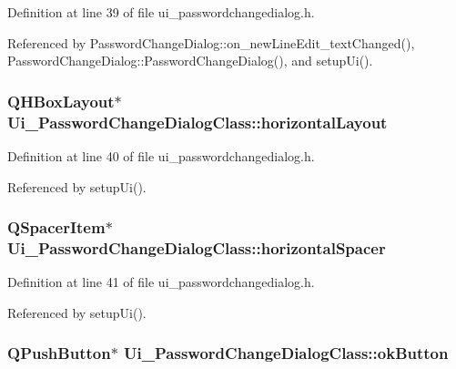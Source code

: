 Definition at line 39 of file ui\_\-passwordchangedialog.h.

Referenced by PasswordChangeDialog::on\_\-newLineEdit\_\-textChanged(), PasswordChangeDialog::PasswordChangeDialog(), and setupUi().\hypertarget{class_ui___password_change_dialog_class_3b41b6252f3602ab1cb67f958ed87c5e}{
\subsubsection[horizontalLayout]{\setlength{\rightskip}{0pt plus 5cm}QHBoxLayout$\ast$ {\bf Ui\_\-PasswordChangeDialogClass::horizontalLayout}}}
\label{class_ui___password_change_dialog_class_3b41b6252f3602ab1cb67f958ed87c5e}




Definition at line 40 of file ui\_\-passwordchangedialog.h.

Referenced by setupUi().\hypertarget{class_ui___password_change_dialog_class_c0836409454080446b32ea2f1e7375f3}{
\subsubsection[horizontalSpacer]{\setlength{\rightskip}{0pt plus 5cm}QSpacerItem$\ast$ {\bf Ui\_\-PasswordChangeDialogClass::horizontalSpacer}}}
\label{class_ui___password_change_dialog_class_c0836409454080446b32ea2f1e7375f3}




Definition at line 41 of file ui\_\-passwordchangedialog.h.

Referenced by setupUi().\hypertarget{class_ui___password_change_dialog_class_2452c6e8211eb599dc99f288d1bcde72}{
\subsubsection[okButton]{\setlength{\rightskip}{0pt plus 5cm}QPushButton$\ast$ {\bf Ui\_\-PasswordChangeDialogClass::okButton}}}
\label{class_ui___password_change_dialog_class_2452c6e8211eb599dc99f288d1bcde72}




